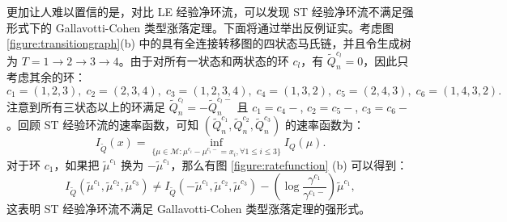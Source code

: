 更加让人难以置信的是，对比 LE 经验净环流，可以发现 ST 经验净环流不满足强形式下的 Gallavotti-Cohen 类型涨落定理。下面将通过举出反例证实。考虑图 \ref{figure:transitiongraph}(b) 中的具有全连接转移图的四状态马氏链，并且令生成树为 $T=1\to2\to3\to4$。由于对所有一状态和两状态的环 $c_l$，有 $\tilde{Q}^{c_l}_n=0$，因此只考虑其余的环：
\begin{equation*}
	c_1 = (1,2,3),\;c_2 = (2,3,4),\;c_3 = (1,2,3,4),\;c_4 = (1,3,2),\;
	c_5 = (2,4,3),\;c_6 = (1,4,3,2).
\end{equation*}
注意到所有三状态以上的环满足 $\tilde{Q}^{c_l}_n=-\tilde{Q}^{c_l-}_n$ 且 $c_1=c_4-$, $c_2=c_5-$, $c_3=c_6-$。回顾 ST 经验环流的速率函数，可知 $(\tilde{Q}^{c_1}_n,\tilde{Q}^{c_2}_n,\tilde{Q}^{c_3}_n)$ 的速率函数为：
\begin{equation*}
	I_{\tilde{Q}}(x)=\inf_{\{\mu\in\mathcal{M}:\mu^{c_i}-\mu^{c_i-}= x_i,\forall 1\le i\le 3\}}I_Q(\mu).
\end{equation*}
对于环 $c_1$，如果把 $\tilde{\mu}^{c_1}$ 换为 $-\tilde{\mu}^{c_1}$，那么有图 \ref{figure:ratefunction} (b) 可以得到：
\begin{equation*}
I_{\tilde{Q}}(\tilde{\mu}^{c_1},\tilde{\mu}^{c_2},\tilde{\mu}^{c_3})\neq I_{\tilde{Q}}(-\tilde{\mu}^{c_1},\tilde{\mu}^{c_2},\tilde{\mu}^{c_3})
-\left(\log\frac{\gamma^{c_1}}{\gamma^{c_1-}}\right)\tilde{\mu}^{c_1},
\end{equation*}
这表明 ST 经验净环流不满足 Gallavotti-Cohen 类型涨落定理的强形式。